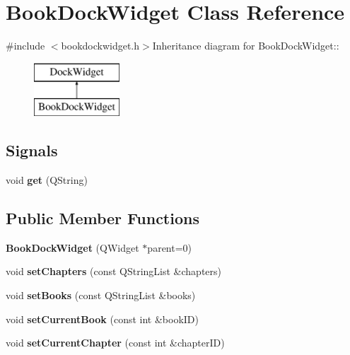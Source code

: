 \hypertarget{classBookDockWidget}{
\section{BookDockWidget Class Reference}
\label{classBookDockWidget}
}


{\ttfamily \#include $<$bookdockwidget.h$>$}Inheritance diagram for BookDockWidget::\begin{figure}[H]
\begin{center}
\leavevmode
\includegraphics[height=2cm]{classBookDockWidget}
\end{center}
\end{figure}
\subsection*{Signals}
\begin{DoxyCompactItemize}
\item 
\hypertarget{classBookDockWidget_a1c706baddb8a67185b4fd62af5e8b1a8}{
void {\bfseries get} (QString)}
\label{classBookDockWidget_a1c706baddb8a67185b4fd62af5e8b1a8}

\end{DoxyCompactItemize}
\subsection*{Public Member Functions}
\begin{DoxyCompactItemize}
\item 
\hypertarget{classBookDockWidget_af5c76e68675b6b8537339a04087225df}{
{\bfseries BookDockWidget} (QWidget $\ast$parent=0)}
\label{classBookDockWidget_af5c76e68675b6b8537339a04087225df}

\item 
\hypertarget{classBookDockWidget_a3e3072148739620a1a062271f41a082b}{
void {\bfseries setChapters} (const QStringList \&chapters)}
\label{classBookDockWidget_a3e3072148739620a1a062271f41a082b}

\item 
\hypertarget{classBookDockWidget_a0a52db7a837f9919f4efbf67d6aa63e6}{
void {\bfseries setBooks} (const QStringList \&books)}
\label{classBookDockWidget_a0a52db7a837f9919f4efbf67d6aa63e6}

\item 
\hypertarget{classBookDockWidget_a576c69237313077d9a6fe0a108ba0d26}{
void {\bfseries setCurrentBook} (const int \&bookID)}
\label{classBookDockWidget_a576c69237313077d9a6fe0a108ba0d26}

\item 
\hypertarget{classBookDockWidget_a2c9972f1387ab48168c6ac6d2a1e15b7}{
void {\bfseries setCurrentChapter} (const int \&chapterID)}
\label{classBookDockWidget_a2c9972f1387ab48168c6ac6d2a1e15b7}

\end{DoxyCompactItemize}
